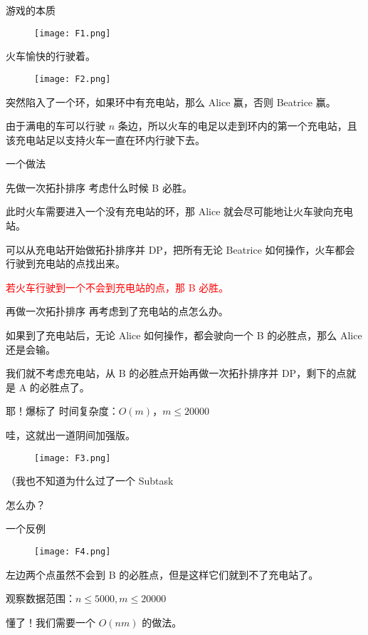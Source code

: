 \documentclass{ctexbeamer}
\begin{document}
	\begin{frame}{游戏的本质}
		\begin{figure}
			\texttt{[image: F1.png]}
		\end{figure}

		火车愉快的行驶着。

		\begin{figure}
			\texttt{[image: F2.png]}
		\end{figure}

		突然陷入了一个环，如果环中有充电站，那么 Alice 赢，否则 Beatrice 赢。

		由于满电的车可以行驶 $n$ 条边，所以火车的电足以走到环内的第一个充电站，且该充电站足以支持火车一直在环内行驶下去。
	\end{frame}

	\begin{frame}{一个做法}
		\begin{block}{先做一次拓扑排序}
			考虑什么时候 B 必胜。

			此时火车需要进入一个没有充电站的环，那 Alice 就会尽可能地让火车驶向充电站。

			可以从充电站开始做拓扑排序并 DP，把所有无论 Beatrice 如何操作，火车都会行驶到充电站的点找出来。

			\textcolor{red}{若火车行驶到一个不会到充电站的点，那 B 必胜。}
		\end{block}

		\begin{block}{再做一次拓扑排序}
			再考虑到了充电站的点怎么办。
			
			如果到了充电站后，无论 Alice 如何操作，都会驶向一个 B 的必胜点，那么 Alice 还是会输。

			我们就不考虑充电站，从 B 的必胜点开始再做一次拓扑排序并 DP，剩下的点就是 A 的必胜点了。
		\end{block}
	\end{frame}

	\begin{frame}{耶！爆标了}
		时间复杂度：$O(m)$，$m\leq 20000$

		哇，这就出一道阴间加强版。

		\begin{figure}
			\texttt{[image: F3.png]}
		\end{figure}

		（我也不知道为什么过了一个 Subtask
	\end{frame}

	\begin{frame}{怎么办？}
		\begin{exampleblock}{一个反例}
			\begin{figure}
				\texttt{[image: F4.png]}
			\end{figure}
		\end{exampleblock}

		左边两个点虽然不会到 B 的必胜点，但是这样它们就到不了充电站了。

		观察数据范围：$n\leq 5000, m\leq 20000$

		懂了！我们需要一个 $O(nm)$ 的做法。
	\end{frame}
\end{document}
